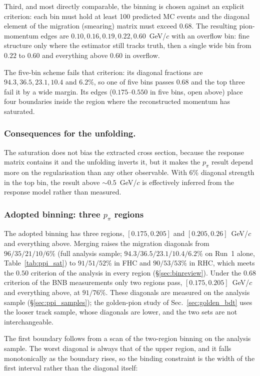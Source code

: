 \documentclass[11pt,a4paper]{article}
\begin{document}
Third, and most directly comparable, the binning is chosen against an explicit criterion:
each bin must hold at least 100 predicted MC events and the diagonal element of the
migration (smearing) matrix must exceed $0.68$. The resulting pion-momentum edges are
$0.10, 0.16, 0.19, 0.22, 0.60$~GeV/$c$ with an overflow bin: fine structure only where
the estimator still tracks truth, then a single wide bin from $0.22$ to $0.60$ and
everything above $0.60$ in overflow.

The five-bin scheme fails that criterion: its diagonal fractions are
$94.3, 36.5, 23.1, 10.4$ and $6.2\%$, so one of five bins passes $0.68$
and the top three fail it by a wide margin. Its edges ($0.175$--$0.550$ in five bins, open
above) place four boundaries inside the region where the reconstructed momentum has
saturated.

\subsubsection{Consequences for the unfolding.}
The saturation does not bias the extracted cross section, because the response matrix
contains it and the unfolding inverts it, but it makes the $p_\pi$ result depend more on the
regularisation than any other observable. With $6\%$
diagonal strength in the top bin, the result above $\sim\!0.5$~GeV/$c$ is effectively
inferred from the response model rather than measured.

\subsubsection*{Adopted binning: three $p_\pi$ regions}
\label{sec:ppi2bin_adopted}

The adopted binning has three regions, $[0.175, 0.205]$ and $[0.205, 0.26]$~GeV/$c$ and
everything above. Merging raises the migration diagonals from $96/35/21/10/6\%$ (full
analysis sample; $94.3/36.5/23.1/10.4/6.2\%$ on Run~1 alone, Table~\ref{tab:ppi_sat}) to
$91/51/52\%$ in FHC and $90/53/53\%$ in RHC, which meets the $0.50$ criterion of the analysis
in every region (\S\ref{sec:binreview}). Under the $0.68$ criterion of the BNB measurements
only two regions pass, $[0.175, 0.205]$~GeV/$c$ and everything above, at $91/76\%$. These
diagonals are measured on the analysis sample (\S\ref{sec:ppi_samples}); the golden-pion study of
Sec.~\ref{sec:golden_bdt} uses the looser track sample, whose diagonals are lower, and the two
sets are not interchangeable.

The first boundary follows from a scan of the two-region binning on the analysis sample. The worst diagonal is
always that of the upper region, and it falls monotonically as the boundary rises, so the
binding constraint is the width of the first interval rather than the diagonal itself:
\end{document}
